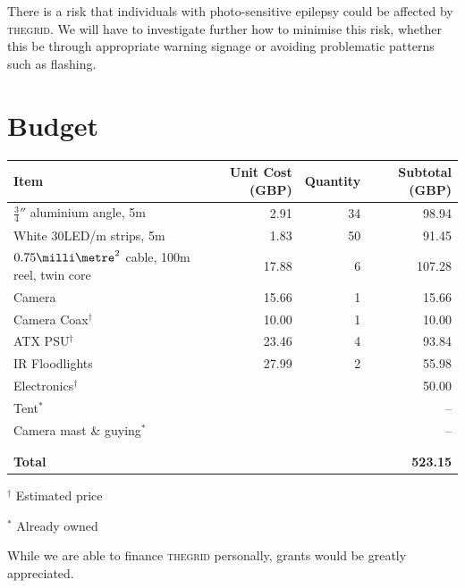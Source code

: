\documentclass[12pt]{article} %
\newcommand{\thegrid}{\textsc{the\textperiodcentered grid}\xspace}
\begin{document}
There is a risk that individuals with photo-sensitive epilepsy could be
affected by \thegrid.  We will have to investigate further how to minimise this
risk, whether this be through appropriate warning signage or avoiding
problematic patterns such as flashing.

\clearpage
\section{Budget}

\begin{table}[ht]
    \centering
    \begin{tabular}{l|r|r|r}
        Item & Unit Cost (GBP) & Quantity & Subtotal (GBP) \\
        \hline
        $\frac{3}{4}''$ aluminium angle, 5m & 2.91 & 34 & 98.94\\
                 White 30LED/m strips, 5m & 1.83 & 50 & 91.45\\
$0.75\milli\metre^2$ cable, 100m reel, twin core & 17.88 & 6 & 107.28\\
                               Camera & 15.66 & 1 & 15.66\\
                               Camera Coax$^\dagger$ & 10.00 & 1 & 10.00\\
                              ATX PSU$^\dagger$ & 23.46 & 4 & 93.84\\
                       IR Floodlights & 27.99 & 2 & 55.98\\
                          Electronics$^\dagger$ & & & 50.00\\
                    Tent$^\ast$ & & & --\\
                   Camera mast \& guying$^\ast$ & & & --\\

                                &&&\\
                                &&&\\

                 \textbf{Total} & & & \textbf{523.15}\\

    \end{tabular}
\end{table}

$^\dagger$ Estimated price

$^\ast$ Already owned

\vspace{2cm}

While we are able to finance \thegrid personally, grants would be greatly
appreciated.
\end{document}
